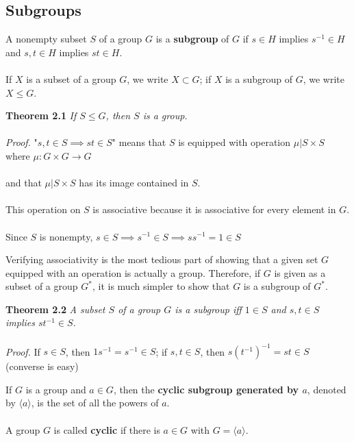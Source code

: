 \documentclass{article}
\begin{document}
\subsection{Subgroups}
A nonempty subset \(S\) of a group \(G\) is a \textbf{subgroup} of \(G\) if \(s\in H\) implies \(s^{-1}\in H\) and \(s,t\in H\) implies \(st\in H\).\\\\
If \(X\) is a subset of a group \(G\), we write \(X\subset G\); if \(X\) is a subgroup of \(G\), we write \(X\le G\).\\
\begin{redrules}\color{red}
\textbf{Theorem 2.1} \textit{If \(S\le G\), then \(S\) is a group.}\\\\\color{black}
\textit{Proof.} "\(s,t\in S\implies st\in S\)" means that \(S\) is equipped with operation \(\mu|S\times S\) where \(\mu: G\times G\to G\)\\\\
\null\qquad and that \(\mu|S\times S\) has its image contained in \(S\).\\\\
This operation on \(S\) is associative because it is associative for every element in \(G\).\\\\
Since \(S\) is nonempty, \(s\in S\implies s^{-1}\in S\implies ss^{-1}=1\in S\)
\end{redrules}
Verifying associativity is the most tedious part of showing that a given set \(G\) equipped 
with an operation is actually a group. Therefore, if \(G\) is given as a subset of a group \(G^{*}\), 
it is much simpler to show that \(G\) is a subgroup of \(G^{*}\).\\
\begin{redrules}\color{red}
\textbf{Theorem 2.2} \textit{A subset \(S\) of a group \(G\) is a subgroup iff \(1\in S\) and \(s,t\in S\) implies \(st^{-1}\in S\).}\\\\\color{black}
\textit{Proof.} If \(s\in S\), then \(1s^{-1}=s^{-1}\in S\); if \(s,t\in S\), then \(s(t^{-1})^{-1}=st\in S\) (converse is easy)
\end{redrules}
If \(G\) is a group and \(a\in G\), then the \textbf{cyclic subgroup generated by \(a\)}, denoted by \(\langle a\rangle\), is the set of all the powers of \(a\).\\\\
A group \(G\) is called \textbf{cyclic} if there is \(a\in G\) with \(G=\langle a\rangle\).\\\\
\end{document}
